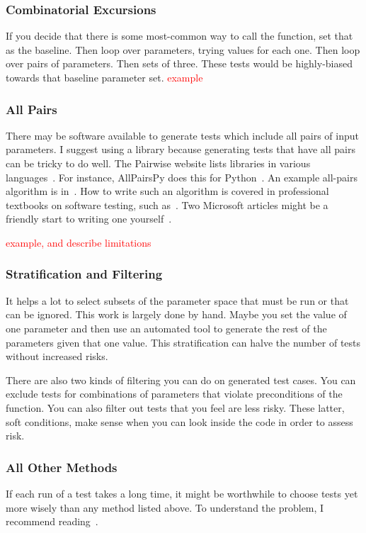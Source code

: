 \documentclass[fleqn,10pt]{olplainarticle}
\newcommand{\aside}[1]{\textcolor{red}{#1}}
\begin{document}
\subsubsection{Combinatorial Excursions}
If you decide that there is some most-common way to call
the function, set that as the baseline. Then loop over parameters,
trying values for each one. Then loop over pairs of parameters.
Then sets of three. These tests would be highly-biased
towards that baseline parameter set. \aside{example}

\subsubsection{All Pairs}
There may be software available to generate tests which
include all pairs of input parameters.
I suggest using a library because generating tests that have
all pairs can be tricky to do well.
The Pairwise website lists libraries in
various languages~\cite{Pairwise}. For instance, AllPairsPy
does this for Python~\cite{allpairspy}.
An example all-pairs algorithm is in~\citet{tung2000automating}.
How to write such an algorithm is covered in professional
textbooks on software testing, such as~\citet{pezze2008}.
Two Microsoft articles might be a friendly start to writing
one yourself~\citep{blass2002,czerwoka2006}.

\aside{example, and describe limitations}


\subsubsection{Stratification and Filtering}
It helps a lot to select subsets of the parameter
space that must be run or that can be ignored. This work
is largely done by hand. Maybe you set the value of one parameter
and then use an automated tool to generate the rest of
the parameters given that one value. This stratification
can halve the number of tests without increased risks.

There are also two kinds of filtering you can do on 
generated test cases. You can exclude tests for combinations
of parameters that violate preconditions of the function.
You can also filter out tests that you feel are less risky.
These latter, soft conditions, make sense when you can
look inside the code in order to assess risk.


\subsubsection{All Other Methods}
If each run of a test takes a long time, it might be worthwhile
to choose tests yet more wisely than any method listed above.
To understand the problem, I recommend reading~\citet{petke2015practical}.
\end{document}
